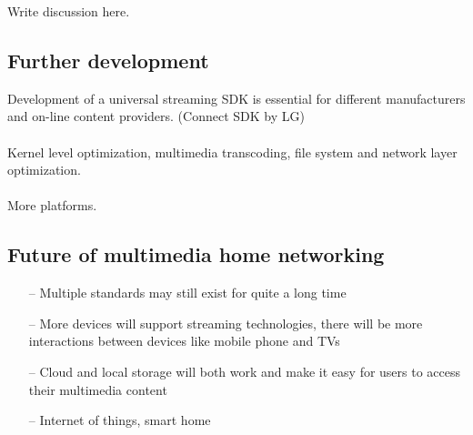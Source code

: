 
Write discussion here.

\subsection{Further development}
Development of a universal streaming SDK is essential for different
manufacturers and on-line content providers. (Connect SDK by LG)\\
\\
Kernel level optimization, multimedia transcoding, file system and network layer
optimization.\\
\\
More platforms.
\subsection{Future of multimedia home networking}
\begin{itemize}
\item[--] Multiple standards may still exist for quite a long time
\item[--] More devices will support streaming technologies, there will be more interactions between devices like mobile phone and TVs
\item[--] Cloud and local storage will both work and make it easy for users to access their multimedia content
\item[--] Internet of things, smart home
\end{itemize}